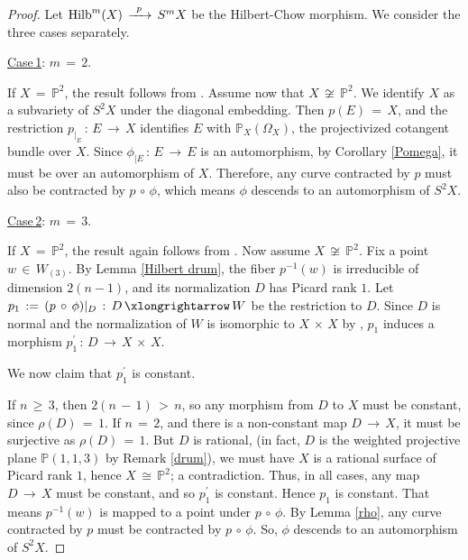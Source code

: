 \documentclass[12pt,reqno]{amsart}
\theoremstyle{definition}
\numberwithin{equation}{section}
\begin{document}
\begin{proof}
    Let $\textnormal{Hilb}^{m}(X)\,\xrightarrow{\,\,\,p\,\,\,}\, S^{m} X$ be the Hilbert-Chow morphism. We consider the three cases separately. 

\underline{\textrm{Case}\,1}: $m\,=\,2.$

If $X\, =\, \mathbb{P}^{2}$, the result follows from \cite{belmans2020automorphisms}.
Assume now that $X\,\not\cong\, \mathbb{P}^{2}$. We identify $X$ as a subvariety of $S^{2} X$ under the diagonal embedding. Then $p(E)\, = \,X$, and the restriction $p_{{|}_{E}}\, :\, E\, \longrightarrow\, X$ identifies $E$ with $\mathbb{P}_{X}(\Omega_{X})$, the projectivized cotangent bundle over $X$. Since $\phi_{{|}E}\, :\, E\,\longrightarrow\, E$ is an automorphism, by Corollary \ref{Pomega}, it must be over an automorphism of $X$. Therefore, any curve contracted by $p$ must also be contracted by $p\,\circ\, \phi$, which means $\phi$ descends to an automorphism of $S^2X.$

\underline{\textrm{Case}\,2}: $m\,=\,3.$

If $X\,=\, \mathbb{P}^{2}$, the result again follows from \cite{belmans2020automorphisms}. Now assume $X\,\not\cong \,\mathbb{P}^{2}$. Fix a point $w\,\in\,W_{(3)}$. By Lemma \ref{Hilbert drum}, the fiber $p^{-1}(w)$ is irreducible of dimension $2(n-1)$, and its  normalization $D$ has Picard rank $1$. Let $p_{1}\,:=\, (p\,\circ\,\phi)|_{D} \,:\,D\,\xlongrightarrow\, W$ be the restriction to $D$. Since $D$ is normal and the normalization of $W$ is isomorphic to $X\,\times\,X$ by {\cite[Theorem 2]{BSV3}}, $p_{1}$ induces a morphism $p_{1}^{\prime}\,:\, D\,\longrightarrow\, X\,\times\,X$.

We now claim that $p_{1}^{\prime}$ is constant.

If $n\,\geq\,3$, then $2(n\,-\,1)\,>\,n$, so any morphism from $D$ to $X$ must be constant, since $\rho(D)\,=\,1$. If $n\,=\,2$, and there is a non-constant map $D\,\longrightarrow\,X$, it must be surjective as $\rho(D)\,=\,1$. But $D$ is rational, (in fact, $D$ is the weighted projective plane $\mathbb{P}(1,1,3)$ by Remark \ref{drum}), we must have $X$ is a rational surface of Picard rank $1$, hence $X\,\cong\,\mathbb{P}^{2}$; a contradiction. Thus, in all cases, any map $D\,\longrightarrow\, X$ must be constant, and so $p_{1}^{\prime}$ is constant. Hence $p_{1}$ is constant. That means $p^{-1}(w)$ is mapped to a point under $p\,\circ\,\phi$. By Lemma \ref{rho}, any curve contracted by $p$ must be contracted by $p\,\circ\,\phi$. So, $\phi$ descends to an automorphism of $S^2X.$ 


\end{proof}
\end{document}

